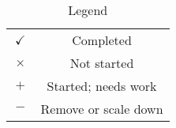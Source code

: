 \begin{table}
    \centering
\begin{tabular}{cc}
\hline
    $\boxed{\checkmark}$ & Completed \\
    $\boxed{\times}$ & Not started \\
    $\boxed{+}$ & Started; needs work \\
    $\boxed{-}$ & Remove or scale down \\
    \hline
\end{tabular}    
    \caption{Legend}
    \label{tab:legend}
\end{table}
